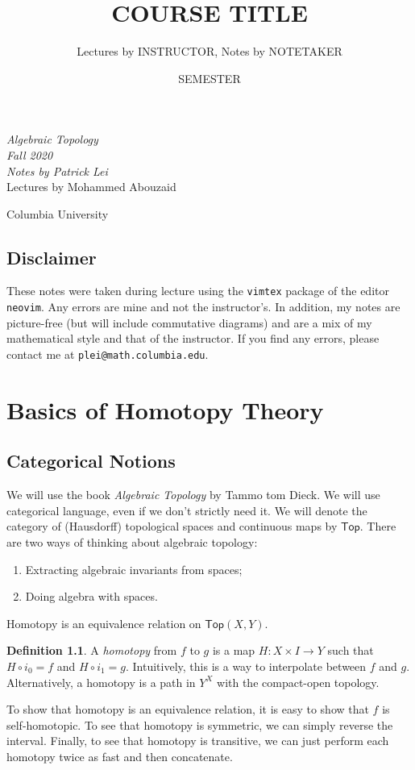 \documentclass[leqno, openany]{memoir}
\title{COURSE TITLE}
\author{Lectures by INSTRUCTOR, Notes by NOTETAKER}
\date{SEMESTER}
\theoremstyle{definition}
\newtheorem{defn}[thm]{Definition}
\theoremstyle{remark}
\theoremstyle{plain}
\theoremstyle{definition}
\theoremstyle{remark}
\newcommand{\ms}[1]{\mathsf{#1}}
\newcommand*{\titleSW}
    {\begingroup%
    \raggedleft
    \vspace*{\baselineskip}
    {\Huge\itshape Algebraic Topology \\ Fall 2020}\\[\baselineskip]
    {\large\itshape Notes by Patrick Lei}\\[0.2\textheight]
    {\Large Lectures by Mohammed Abouzaid}\par
    \vfill
    {\Large \sffamily Columbia University}
    \vspace*{\baselineskip}
\endgroup}
\begin{document}
    
\begin{titlingpage}
\titleSW
\end{titlingpage}

\thispagestyle{empty}
\section*{Disclaimer}%
\label{sec:disclaimer}

These notes were taken during lecture using the \texttt{vimtex} package of the editor \texttt{neovim}. 
Any errors are mine and not the instructor's. 
In addition, my notes are picture-free (but will include commutative diagrams) and are a mix of my mathematical style and that of the instructor.
If you find any errors, please contact me at \texttt{plei@math.columbia.edu}.
\newpage


\tableofcontents

\chapter{Basics of Homotopy Theory}%
\label{cha:basic_notions}

\section{Categorical Notions}%
\label{sec:categorical_notions}

We will use the book \textit{Algebraic Topology} by Tammo tom Dieck. We will use categorical language, even if we don't strictly need it. We will denote the category of (Hausdorff) topological spaces and continuous maps by $\ms{Top}$. There are two ways of thinking about algebraic topology:
\begin{enumerate}
    \item Extracting algebraic invariants from spaces;
    \item Doing algebra with spaces.
\end{enumerate}

Homotopy is an equivalence relation on $\ms{Top}(X,Y)$. 

\begin{defn}
    A \textit{homotopy} from $f$ to $g$ is a map $H: X \times I \to Y$ such that $H \circ i_0 = f$ and $H \circ i_1 = g$. Intuitively, this is a way to interpolate between $f$ and $g$. Alternatively, a homotopy is a path in $Y^X$ with the compact-open topology.
\end{defn} 

To show that homotopy is an equivalence relation, it is easy to show that $f$ is self-homotopic. To see that homotopy is symmetric, we can simply reverse the interval. Finally, to see that homotopy is transitive, we can just perform each homotopy twice as fast and then concatenate.
\end{document}
